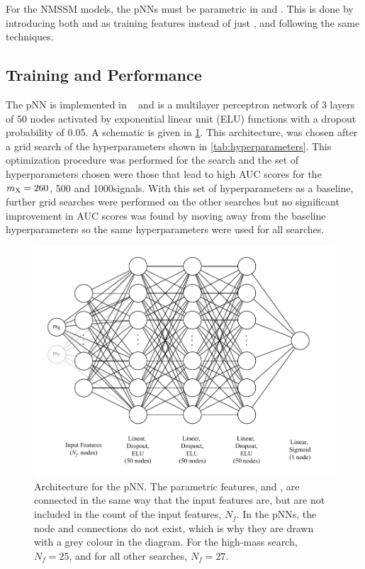 For the NMSSM models, the pNNs must be parametric in \mX and \mY. This is done by introducing both \mX and \mY as training features instead of just \mX, and following the same techniques. 


\subsection{Training and Performance}\label{sec:categorisation_performance}

The pNN is implemented in \PyTorch~\cite{PyTorch} and is a multilayer perceptron network of 3 layers of 50 nodes activated by exponential linear unit (ELU) functions with a dropout probability of 0.05. A schematic is given in \cref{fig:pNN_architecture}. This architecture, was chosen after a grid search of the hyperparameters shown in \cref{tab:hyperparameters}. This optimization procedure was performed for the \XTwoHH search and the set of hyperparameters chosen were those that lead to high AUC scores for the $m_{\mathrm{X}}=260$, 500 and 1000\GeV signals. With this set of hyperparameters as a baseline, further grid searches were performed on the other searches but no significant improvement in AUC scores was found by moving away from the baseline hyperparameters so the same hyperparameters were used for all searches.

\begin{figure}
    \centering
    \includegraphics[width=\textwidth]{Figures/Dihiggs/nn_architecture.pdf}
    \caption[Architecture for the pNN]{Architecture for the pNN. The parametric features, \mX and \mY, are connected in the same way that the input features are, but are not included in the count of the input features, $N_f$. In the \XHH pNNs, the \mY node and connections do not exist, which is why they are drawn with a grey colour in the diagram. For the high-mass \XYggHtt search, $N_f=25$, and for all other searches, $N_f=27$.}\label{fig:pNN_architecture}
\end{figure}

